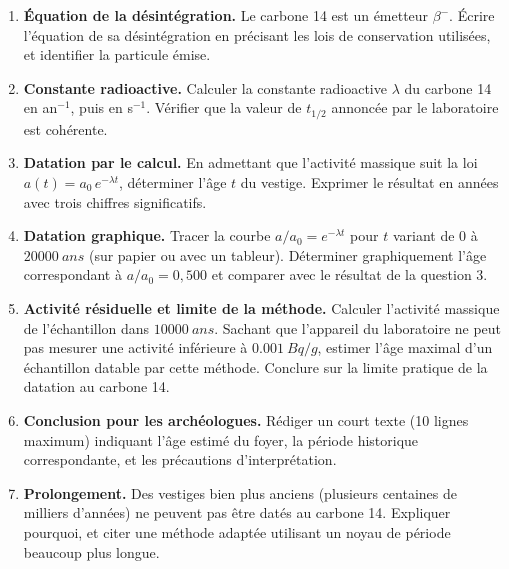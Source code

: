 \documentclass[11pt]{article}
\newcounter{popsec}
\newcounter{popsub}
\newcommand{\courssub}[1]{%
  \stepcounter{popsub}%
  \par\vspace{9pt}\noindent{\popxbold\fontsize{11.5}{13}\selectfont\color{popink}{\color{poporange}\thepopsec.\thepopsub}\hspace{6pt}#1}\par\nopagebreak\vspace{4pt}
}
\begin{document}
\begin{enumerate}
\item \textbf{Équation de la désintégration.} Le carbone 14 est un émetteur $\beta^-$. Écrire l'équation de sa désintégration en précisant les lois de conservation utilisées, et identifier la particule émise.
\item \textbf{Constante radioactive.} Calculer la constante radioactive $\lambda$ du carbone 14 en an$^{-1}$, puis en s$^{-1}$. Vérifier que la valeur de $t_{1/2}$ annoncée par le laboratoire est cohérente.
\item \textbf{Datation par le calcul.} En admettant que l'activité massique suit la loi $a(t) = a_0\,e^{-\lambda t}$, déterminer l'âge $t$ du vestige. Exprimer le résultat en années avec trois chiffres significatifs.
\item \textbf{Datation graphique.} Tracer la courbe $a/a_0 = e^{-\lambda t}$ pour $t$ variant de $0$ à $\SI{20000}{ans}$ (sur papier ou avec un tableur). Déterminer graphiquement l'âge correspondant à $a/a_0 = 0,500$ et comparer avec le résultat de la question 3.
\item \textbf{Activité résiduelle et limite de la méthode.} Calculer l'activité massique de l'échantillon dans $\SI{10000}{ans}$. Sachant que l'appareil du laboratoire ne peut pas mesurer une activité inférieure à $\SI{0,001}{Bq/g}$, estimer l'âge maximal d'un échantillon datable par cette méthode. Conclure sur la limite pratique de la datation au carbone 14.
\item \textbf{Conclusion pour les archéologues.} Rédiger un court texte (10 lignes maximum) indiquant l'âge estimé du foyer, la période historique correspondante, et les précautions d'interprétation.
\item \textbf{Prolongement.} Des vestiges bien plus anciens (plusieurs centaines de milliers d'années) ne peuvent pas être datés au carbone 14. Expliquer pourquoi, et citer une méthode adaptée utilisant un noyau de période beaucoup plus longue.
\end{enumerate}

\courssub{Ressources à mobiliser}
\end{document}
